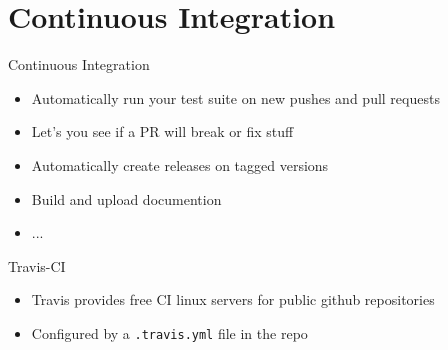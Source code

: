 \section{Continuous Integration}

\begin{frame}[c]{Continuous Integration}
  \begin{itemize}
    \item Automatically run your test suite on new pushes and pull requests
    \item Let's you see if a PR will break or fix stuff
    \item Automatically create releases on tagged versions
    \item Build and upload documention
    \item ...
  \end{itemize} 
\end{frame}
\begin{frame}[c]{Travis-CI}
  \begin{itemize}
    \item Travis provides free CI linux servers for public github repositories
    \item Configured by a \texttt{.travis.yml} file in the repo
  \end{itemize}
\end{frame}

